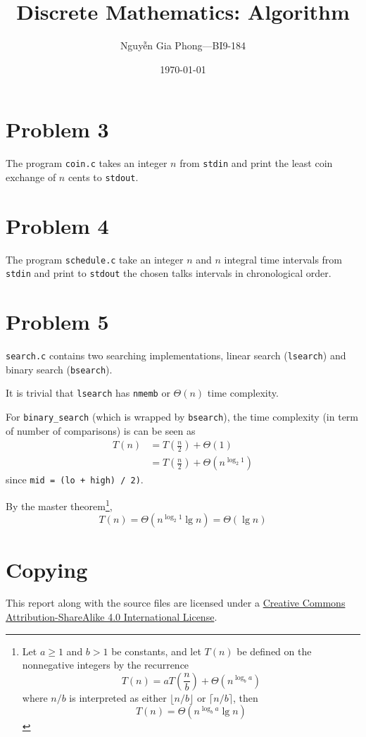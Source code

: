 \documentclass[a4paper,12pt]{article}
\title{Discrete Mathematics: Algorithm}
\author{Nguyễn Gia Phong---BI9-184}
\date{\dateenglish\today}
\begin{document}
\maketitle
\section{Problem 3}
The program \verb|coin.c| takes an integer $n$ from \verb|stdin| and print
the least coin exchange of $n$ cents to \verb|stdout|.

\section{Problem 4}
The program \verb|schedule.c| take an integer $n$ and $n$ integral
time intervals from \verb|stdin| and print to \verb|stdout| the chosen talks
intervals in chronological order.

\section{Problem 5}
\verb|search.c| contains two searching implementations, linear search
(\verb|lsearch|) and binary search (\verb|bsearch|).

It is trivial that \verb|lsearch| has \verb|nmemb| or $\Theta(n)$
time complexity.

For \verb|binary_search| (which is wrapped by \verb|bsearch|),
the time complexity (in term of number of comparisons) is can be seen as
\begin{align*}
  T(n) &= T\left(\frac{n}{2}\right) + \Theta(1)\\
  &= T\left(\frac{n}{2}\right) + \Theta\left(n^{\log_2 1}\right)
\end{align*}
since \verb|mid = (lo + high) / 2)|.
\pagebreak

By the master theorem\footnote{Let $a \ge 1$ and $b > 1$ be constants,
and let $T(n)$ be defined on the nonnegative integers by the recurrence
\[T(n) = aT\left(\frac{n}{b}\right) + \Theta\left(n^{\log_b a}\right)\]
where $n/b$ is interpreted as either $\lfloor n/b\rfloor$ or $\lceil n/b\rceil$,
then \[T(n) = \Theta\left(n^{\log_b a}\lg n\right)\]},
\[T(n) = \Theta\left(n^{\log_2 1}\lg n\right) = \Theta(\lg n)\]

\section{Copying}
This report along with the source files are licensed under a
\href{https://creativecommons.org/licenses/by-sa/4.0/}{Creative Commons
Attribution-ShareAlike 4.0 International License}.
\end{document}
